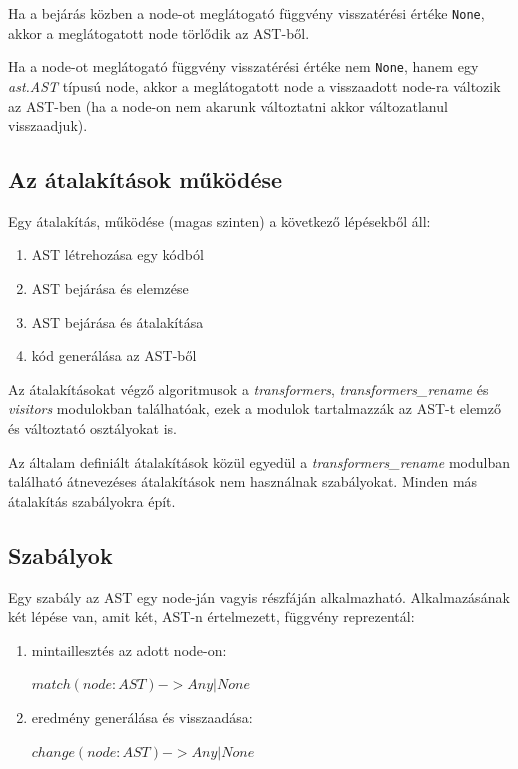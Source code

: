 Ha a bejárás közben a node-ot meglátogató függvény visszatérési értéke \texttt{None},
akkor a meglátogatott node törlődik az AST-ből.

Ha a node-ot meglátogató függvény visszatérési értéke nem \texttt{None},
hanem egy \emph{ast.AST} típusú node,
akkor a meglátogatott node a visszaadott node-ra változik az AST-ben
(ha a node-on nem akarunk változtatni akkor változatlanul visszaadjuk).

\subsection{Az átalakítások működése}

Egy átalakítás, működése (magas szinten) a következő lépésekből áll:

\begin{enumerate}
	\item AST létrehozása egy kódból
	\item AST bejárása és elemzése
	\item AST bejárása és átalakítása
	\item kód generálása az AST-ből
\end{enumerate}

Az átalakításokat végző algoritmusok a \emph{transformers}, \emph{transformers\_rename}
és \emph{visitors} modulokban találhatóak, ezek a modulok tartalmazzák az AST-t
elemző és változtató osztályokat is.

Az általam definiált átalakítások közül egyedül
a \emph{transformers\_rename} modulban található
átnevezéses átalakítások nem használnak szabályokat.
Minden más átalakítás szabályokra épít.

\subsection{Szabályok}

Egy szabály az AST egy node-ján vagyis részfáján alkalmazható.
Alkalmazásának két lépése van, amit két, AST-n értelmezett, függvény reprezentál:

\begin{enumerate}
	\item mintaillesztés az adott node-on:
	
	\(match(node: AST) -> Any | None \)
	
	\item eredmény generálása és visszaadása:
	
	\(change(node: AST) -> Any | None \)
\end{enumerate}

